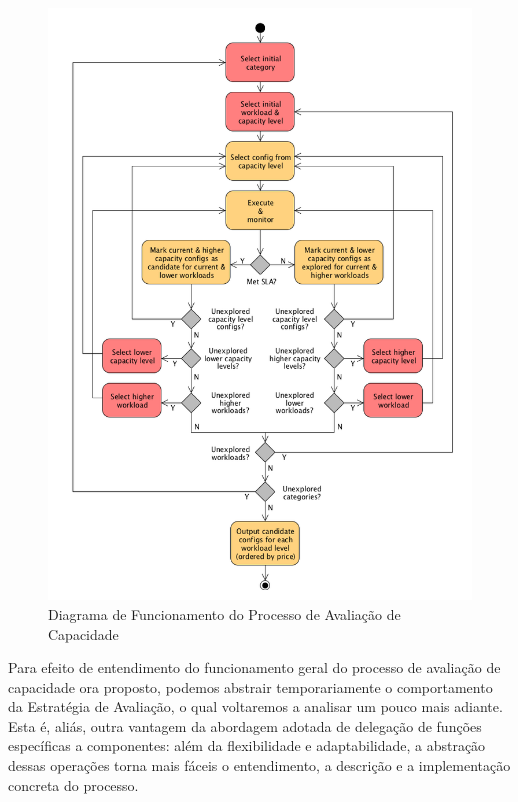 \begin{figure}[hbt]
  \caption{\label{fig_processo_aval_capacidade}Diagrama de Funcionamento do Processo de Avaliação de Capacidade}
  \begin{center}
    \includegraphics[scale=0.4]{img/diagrama-avaliacao-capacidade-v14}
  \end{center}
\end{figure}

Para efeito de entendimento do funcionamento geral do processo de avaliação de 
capacidade ora proposto, podemos abstrair temporariamente o comportamento da 
Estratégia de Avaliação, o qual voltaremos a analisar um pouco mais adiante. 
Esta é, aliás, outra vantagem da abordagem adotada de delegação de funções 
específicas a componentes: além da flexibilidade e adaptabilidade, a abstração 
dessas operações torna mais fáceis o entendimento, a descrição e a implementação 
concreta do processo.   

